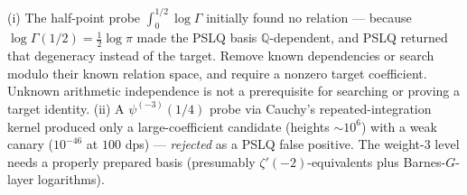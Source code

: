 \begin{negative}\label{integral:neg:psim2}
(i) The half-point probe $\int_0^{1/2}\log\Gamma$ initially found no relation --- because
$\log\Gamma(1/2)=\tfrac12\log\pi$ made the PSLQ basis $\mathbb{Q}$-dependent, and PSLQ
returned that degeneracy instead of the target. Remove known dependencies
or search modulo their known relation space, and require a nonzero target
coefficient. Unknown arithmetic independence is not a prerequisite for
searching or proving a target identity. (ii) A $\psi^{(-3)}(1/4)$ probe via Cauchy's repeated-integration
kernel produced only a large-coefficient candidate (heights $\sim10^6$) with a weak canary
($10^{-46}$ at $100$ dps) --- \emph{rejected} as a PSLQ false positive. The weight-$3$
level needs a properly prepared basis (presumably $\zeta'(-2)$-equivalents plus
Barnes-$G$-layer logarithms).
\end{negative}

